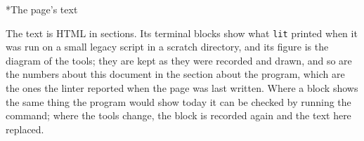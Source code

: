\documentclass[10pt,a4paper]{article}
\makeatletter
\renewcommand\subsection{\@startsection{subsection}{2}{\z@}{-2.6ex \@plus -1ex \@minus -.2ex}{1ex \@plus .2ex}{\normalfont\Large\itshape}}
\makeatother
\begin{document}
\hypertarget{h-The-page-s-text}{}
\subsection*{The page's text}

The text is HTML in sections. Its terminal blocks show what \texttt{lit} printed when it was run on a small legacy script in a scratch directory, and its figure is the diagram of the tools; they are kept as they were recorded and drawn, and so are the numbers about this document in the section about the program, which are the ones the linter reported when the page was last written. Where a block shows the same thing the program would show today it can be checked by running the command; where the tools change, the block is recorded again and the text here replaced.
\end{document}
